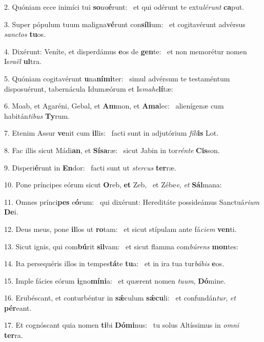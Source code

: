 2. Quóniam ecce inimíci tui \textbf{so}nu\textbf{é}runt: \ast\  et qui odérunt te extu\textit{lé}\textit{runt} \textbf{ca}put.\

3. Super pópulum tuum maligna\textbf{vé}runt con\textbf{sí}\textbf{li}um: \ast\  et cogitavérunt advérsus \textit{sanc}\textit{tos} \textbf{tu}os.\

4. Dixérunt: Veníte, et disperdámus \textbf{e}os de \textbf{gen}te: \ast\  et non memorétur nomen Is\textit{ra}\textit{ël} \textbf{ul}tra.\

5. Quóniam cogitavérunt \textbf{u}na\textbf{ní}\textbf{mi}ter: \ast\  simul advérsum te testaméntum disposuérunt, tabernácula Idumæórum et Is\textit{ma}\textit{he}\textbf{lí}tæ:\

6. Moab, et Agaréni, Gebal, et \textbf{Am}mon, et \textbf{A}\textbf{ma}lec: \ast\  alienígenæ cum habitán\textit{ti}\textit{bus} \textbf{Ty}rum.\

7. Etenim Assur \textbf{ve}nit cum \textbf{il}lis: \ast\  facti sunt in adjutórium \textit{fí}\textit{li}\textbf{is} Lot.\

8. Fac illis sicut Mádi\textbf{an}, et \textbf{Sí}\textbf{sa}ræ: \ast\  sicut Jabin in tor\textit{rén}\textit{te} \textbf{Cis}son.\

9. Disperi\textbf{é}runt in \textbf{En}dor: \ast\  facti sunt ut \textit{ster}\textit{cus} \textbf{ter}ræ.\

10. Pone príncipes eórum sicut \textbf{O}reb, \textbf{et} Zeb, \ast\  et Zébe\textit{e}, \textit{et} \textbf{Sál}mana:\

11. Omnes prínci\textbf{pes} e\textbf{ó}rum: \ast\  qui dixérunt: Hereditáte possideámus Sanctuá\textit{ri}\textit{um} \textbf{De}i.\

12. Deus meus, pone \textbf{il}los ut \textbf{ro}tam: \ast\  et sicut stípulam ante fá\textit{ci}\textit{em} \textbf{ven}ti.\

13. Sicut ignis, qui com\textbf{bú}rit \textbf{sil}vam: \ast\  et sicut flamma com\textit{bú}\textit{rens} \textbf{mon}tes:\

14. Ita persequéris illos in tempes\textbf{tá}te \textbf{tu}a: \ast\  et in ira tua tur\textit{bá}\textit{bis} \textbf{e}os.\

15. Imple fácies eórum \textbf{i}gno\textbf{mí}\textbf{ni}a: \ast\  et quærent nomen \textit{tu}\textit{um}, \textbf{Dó}mine.\

16. Erubéscant, et conturbéntur in \textbf{sǽ}culum \textbf{sǽ}\textbf{cu}li: \ast\  et confundán\textit{tur}, \textit{et} \textbf{pér}eant.\

17. Et cognóscant quia nomen \textbf{ti}bi \textbf{Dó}\textbf{mi}nus: \ast\  tu solus Altíssimus in \textit{om}\textit{ni} \textbf{ter}ra.\

